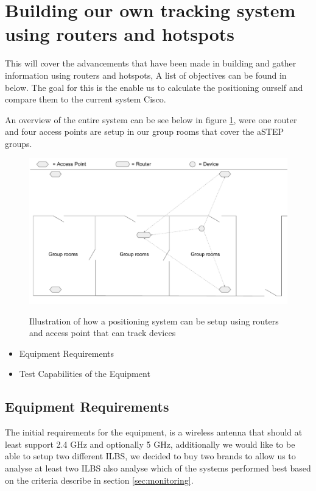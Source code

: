 \section{Building our own tracking system using routers and hotspots}
This will cover the advancements that have been made in building and gather information using routers and hotspots, A list of objectives can be found in below. The goal for this is the enable us to calculate the positioning ourself and compare them to the current system Cisco.

An overview of the entire system can be see below in figure \ref{fig:OwnSetup}, were one router and four access points are setup in our group rooms that cover the aSTEP groups.
\begin{figure}[H]
	\centering
	\includegraphics[scale=0.5]{graphics/Router-AccessPoint_Setup.pdf}
	\label{fig:OwnSetup}
	\caption{Illustration of how a positioning system can be setup using routers and access point that can track devices}
\end{figure}

\begin{itemize}
	\item Equipment Requirements
	\item Test Capabilities of the Equipment
\end{itemize}

\subsection*{Equipment Requirements}
The initial requirements for the equipment, is a wireless antenna that should at least support 2.4 GHz and optionally 5 GHz, additionally we would like to be able to setup two different ILBS, we decided to buy two brands to allow us to analyse at least two ILBS also analyse which of the systems performed best based on the criteria describe in section \ref{sec:monitoring}.

